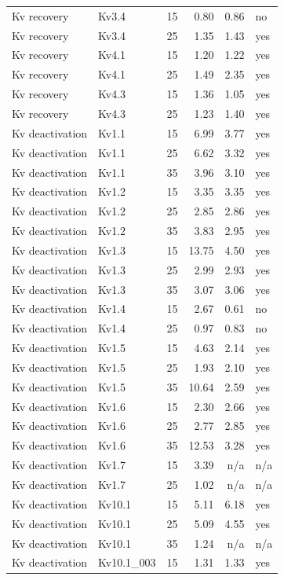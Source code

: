 \begin{longtable}{lllrrl}
Kv recovery & Kv3.4 & 15 & 0.80 & 0.86 & no \\
Kv recovery & Kv3.4 & 25 & 1.35 & 1.43 & yes \\
Kv recovery & Kv4.1 & 15 & 1.20 & 1.22 & yes \\
Kv recovery & Kv4.1 & 25 & 1.49 & 2.35 & yes \\
Kv recovery & Kv4.3 & 15 & 1.36 & 1.05 & yes \\
Kv recovery & Kv4.3 & 25 & 1.23 & 1.40 & yes \\
\midrule
Kv deactivation & Kv1.1 & 15 & 6.99 & 3.77 & yes \\
Kv deactivation & Kv1.1 & 25 & 6.62 & 3.32 & yes \\
Kv deactivation & Kv1.1 & 35 & 3.96 & 3.10 & yes \\
Kv deactivation & Kv1.2 & 15 & 3.35 & 3.35 & yes \\
Kv deactivation & Kv1.2 & 25 & 2.85 & 2.86 & yes \\
Kv deactivation & Kv1.2 & 35 & 3.83 & 2.95 & yes \\
Kv deactivation & Kv1.3 & 15 & 13.75 & 4.50 & yes \\
Kv deactivation & Kv1.3 & 25 & 2.99 & 2.93 & yes \\
Kv deactivation & Kv1.3 & 35 & 3.07 & 3.06 & yes \\
Kv deactivation & Kv1.4 & 15 & 2.67 & 0.61 & no \\
Kv deactivation & Kv1.4 & 25 & 0.97 & 0.83 & no \\
Kv deactivation & Kv1.5 & 15 & 4.63 & 2.14 & yes \\
Kv deactivation & Kv1.5 & 25 & 1.93 & 2.10 & yes \\
Kv deactivation & Kv1.5 & 35 & 10.64 & 2.59 & yes \\
Kv deactivation & Kv1.6 & 15 & 2.30 & 2.66 & yes \\
Kv deactivation & Kv1.6 & 25 & 2.77 & 2.85 & yes \\
Kv deactivation & Kv1.6 & 35 & 12.53 & 3.28 & yes \\
Kv deactivation & Kv1.7 & 15 & 3.39 & n/a & n/a \\
Kv deactivation & Kv1.7 & 25 & 1.02 & n/a & n/a \\
Kv deactivation & Kv10.1 & 15 & 5.11 & 6.18 & yes \\
Kv deactivation & Kv10.1 & 25 & 5.09 & 4.55 & yes \\
Kv deactivation & Kv10.1 & 35 & 1.24 & n/a & n/a \\
Kv deactivation & Kv10.1\_003 & 15 & 1.31 & 1.33 & yes \\

\end{longtable}

